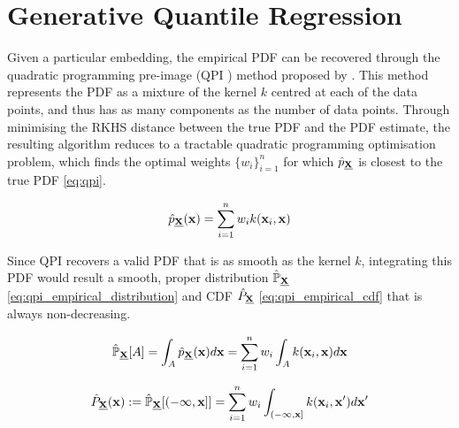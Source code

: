 \documentclass[twoside]{article} \usepackage{aistats2017}
\theoremstyle{definition}
\theoremstyle{remark}
\newcommand{\rv}[1]{\underline{#1}}
\newcommand{\warn}[1]{{\color{RedOrange} #1}}
\newcommand{\qpi}{QPI }
\begin{document}
\section{Generative Quantile Regression}
\label{sec:generative_quantile_regression}

	
	Given a particular embedding, the empirical PDF can be recovered through the quadratic programming pre-image (\qpi) method proposed by \cite{McCalman2013}. This method represents the PDF as a mixture of the kernel $k$ centred at each of the data points, and thus has as many components as the number of data points. Through minimising the RKHS distance between the true PDF and the PDF estimate, the resulting algorithm reduces to a tractable quadratic programming optimisation problem, which finds the optimal weights $\{w_{i}\}_{i = 1}^{n}$ for which $\hat{p}_{\bvec{\rv{X}}}$ is closest to the true PDF \eqref{eq:qpi}. 
	
	\begin{equation}
		\hat{p}_{\bvec{\rv{X}}}(\bvec{x}) = \sum_{i = 1}^{n} w_{i} k(\bvec{x}_{i}, \bvec{x})
	\label{eq:qpi}
	\end{equation}

	Since \qpi recovers a valid PDF that is as smooth as the kernel $k$, integrating this PDF would result a smooth, proper distribution $\hat{\mathbb{P}}_{\bvec{\rv{X}}}$ \eqref{eq:qpi_empirical_distribution} and CDF $\hat{P}_{\bvec{\rv{X}}}$ \eqref{eq:qpi_empirical_cdf} that is always non-decreasing.
	
	\begin{equation}
		\hat{\mathbb{P}}_{\bvec{\rv{X}}}[A] = \int_{A} \hat{p}_{\bvec{\rv{X}}}(\bvec{x}) d\bvec{x} = \sum_{i = 1}^{n} w_{i} \int_{A} k(\bvec{x}_{i}, \bvec{x}) d\bvec{x}
	\label{eq:qpi_empirical_distribution}
	\end{equation}
	
	\begin{equation}
		\hat{P}_{\bvec{\rv{X}}}(\bvec{x}) := \hat{\mathbb{P}}_{\bvec{\rv{X}}}[(-\bvec{\infty}, \bvec{x}]] = \sum_{i = 1}^{n} w_{i} \int_{(-\bvec{\infty}, \bvec{x}]} k(\bvec{x}_{i}, \bvec{x}') d\bvec{x}'
	\label{eq:qpi_empirical_cdf}
	\end{equation}
	
\end{document}
